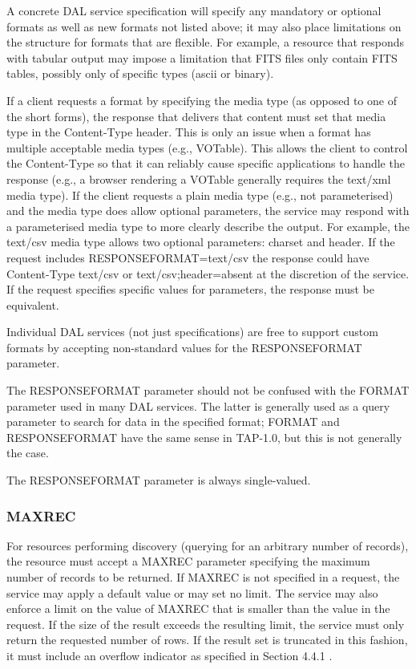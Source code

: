 \documentclass[11pt,letter]{ivoa}
\begin{document}
A concrete DAL service specification will specify any mandatory or optional 
formats as well as new formats not listed above; it may also place limitations 
on the structure for formats that are flexible.  For example, a resource that 
responds with tabular output may impose a limitation that FITS files only 
contain FITS tables, possibly only of specific types (ascii or binary).

If a client requests a format by specifying the media type (as opposed to one of 
the short forms), the response that delivers that content must set that
media type 
in the Content-Type header. This is only an issue when a format has multiple 
acceptable media types (e.g., VOTable). This allows the client to control the 
Content-Type so that it can reliably cause specific applications to handle the 
response (e.g., a browser rendering a VOTable generally requires the text/xml 
media type). If the client requests a plain media type (e.g., not parameterised) and 
the media type does allow optional parameters, the service may respond with a 
parameterised media type to more clearly describe the output. For example, the 
text/csv media type allows two optional parameters: charset and header. If the 
request includes RESPONSEFORMAT=text/csv the response could have Content-Type 
text/csv or text/csv;header=absent at the discretion of the service. If the 
request specifies specific values for parameters, the response must be 
equivalent.

Individual DAL services (not just specifications) are free to support custom 
formats by accepting non-standard values for the RESPONSEFORMAT parameter.

The RESPONSEFORMAT parameter should not be confused with the FORMAT parameter 
used in many DAL services. The latter is generally used as a query parameter to 
search for data in the specified format; FORMAT and RESPONSEFORMAT have the same 
sense in TAP-1.0, but this is not generally the case.

The RESPONSEFORMAT parameter is always single-valued.

\subsubsection{MAXREC}
\label{sec:MAXREC}
For resources performing discovery (querying for an arbitrary number of 
records), the resource must accept a MAXREC parameter specifying the maximum 
number of records to be returned. If MAXREC is not specified in a request, the 
service may apply a default value or may set no limit. The service may also 
enforce a limit on the value of MAXREC that is smaller than the value in the 
request. If the size of the result exceeds the resulting limit, the service must 
only return the requested number of rows. If the result set is truncated in this 
fashion, it must include an overflow indicator as specified in Section 4.4.1 .
\end{document}
